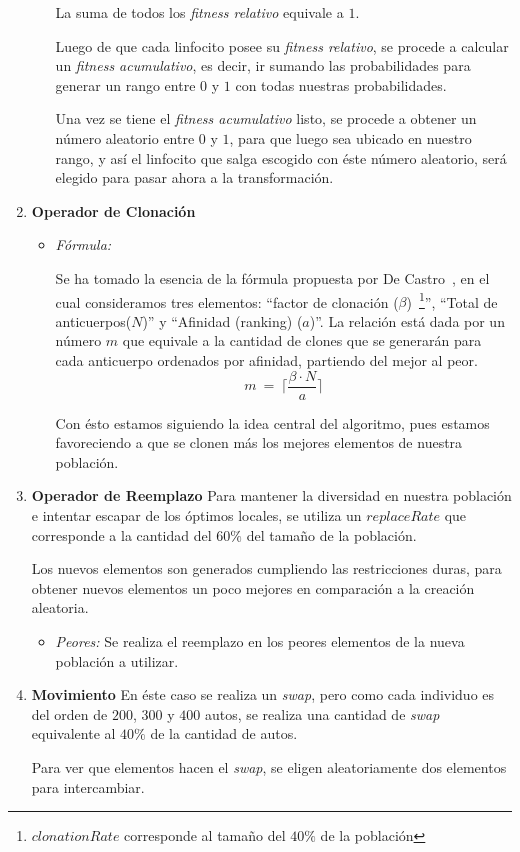 \begin{enumerate}
\begin{itemize}
				La suma de todos los \emph{fitness relativo} equivale a $1$.
					
				Luego de que cada linfocito posee su \emph{fitness relativo}, se procede a calcular un \emph{fitness acumulativo},
				es decir, ir sumando las probabilidades para generar un rango entre $0$ y $1$ con todas nuestras probabilidades.
					
				Una vez se tiene el \emph{fitness acumulativo} listo, se procede a obtener un número aleatorio entre $0$ y $1$,
				para que luego sea ubicado en nuestro rango, y así el linfocito que salga escogido con éste número aleatorio, será
				elegido para pasar ahora a la transformación.
		
		\end{itemize}
	\item \textbf{Operador de Clonación}
		\begin{itemize}
			\item \emph{Fórmula:}

				Se ha tomado la esencia de la fórmula propuesta por De Castro~\cite{decastro},
				en el cual consideramos tres elementos: ``factor de clonación ($\beta$)~\footnote{$clonationRate$
				corresponde al tamaño del $40\%$ de la población}'', ``Total de anticuerpos($N$)'' y
				``Afinidad (ranking) ($a$)''.
				La relación está dada por un número $m$ que equivale a la cantidad de clones que se generarán
				para cada anticuerpo ordenados por afinidad, partiendo del mejor al peor.
				$$m\ =\ \lceil\frac{\beta \cdot N}{a}\rceil$$

				Con ésto estamos siguiendo la idea central del algoritmo, pues estamos favoreciendo a que se clonen más
				los mejores elementos de nuestra población.
				
		\end{itemize}
	\item \textbf{Operador de Reemplazo}
		Para mantener la diversidad en nuestra población e intentar escapar de los óptimos locales,
		se utiliza un $replaceRate$ que corresponde a la cantidad del $60\%$ del tamaño de la población.

		Los nuevos elementos son generados cumpliendo las restricciones duras, para obtener nuevos
		elementos un poco mejores en comparación a la creación aleatoria.
		\begin{itemize}
			\item \emph{Peores:}
				Se realiza el reemplazo en los peores elementos de la nueva población a utilizar.

		\end{itemize}
	\item \textbf{Movimiento}
		En éste caso se realiza un \emph{swap}, pero como cada individuo es del orden de $200$, $300$ y $400$ autos,
		se realiza una cantidad de \emph{swap} equivalente al $40\%$ de la cantidad de autos.
	
		Para ver que elementos hacen el \emph{swap}, se eligen aleatoriamente dos elementos para intercambiar.
\end{enumerate}
